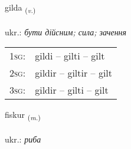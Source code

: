 \documentclass[frontgrid, backgrid]{flacards}\usepackage[]{graphicx}\usepackage[]{xcolor}
\begin{document}
\renewcommand{\flhead}{\vskip5pt \fboxsep=0pt {\small\bfseries\footnotesize Sagnorð | дієслово}}
\renewcommand{\fcfoot}{\vskip5pt \fboxsep=0pt \hspace{2pt}{\small\bfseries\footnotesize 1K}}

\renewcommand{\blhead}{\vskip5pt {\small\bfseries\footnotesize Sagnorð | дієслово }}
\renewcommand{\bcfoot}{\vskip5pt \hspace{2pt}{\small\bfseries\footnotesize 1K}}


{gilda \small{\textsubscript{(\textit{v.})}} \\[1ex] %
\textphonetic{[cɪlta]} \\
ukr.: \emph{бути дійсним; сила; зачення} \\  [2ex]
\renewcommand*{\arraystretch}{0.8}
\begin{tabular}{p{1cm}l}
\textsc{1sg}: & gildi -- gilti -- gilt \\ 
\textsc{2sg}: & gildir -- giltir -- gilt \\ 
\textsc{3sg}: & gildir -- gilti -- gilt \\ 
\end{tabular}
}

\renewcommand{\flhead}{\vskip5pt \fboxsep=0pt {\small\bfseries\footnotesize Nafnorð | іменник}}
\renewcommand{\fcfoot}{\vskip5pt \fboxsep=0pt \hspace{2pt}{\small\bfseries\footnotesize 1K}}

\renewcommand{\blhead}{\vskip5pt {\small\bfseries\footnotesize Nafnorð | іменник }}
\renewcommand{\bcfoot}{\vskip5pt \hspace{2pt}{\small\bfseries\footnotesize 1K}}


{fiskur \small{\textsubscript{(\textit{m.})}} \\[1ex] %
\textphonetic{[fɪskʏr]} \\
ukr.: \emph{риба} \\  [2ex]
\renewcommand*{\arraystretch}{0.8}
}
\end{document}
